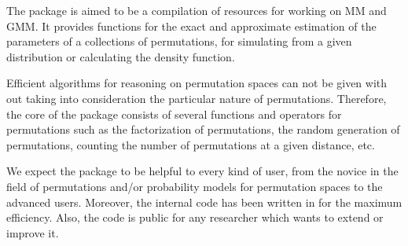 \documentclass[article,nojss]{jss}
\begin{document}
The  package is aimed to be a compilation of resources for working on MM and GMM. It provides functions for the exact and approximate estimation of the parameters of a collections of permutations, for simulating from a given distribution or calculating the density function.

Efficient algorithms for reasoning on permutation spaces can not be given with out taking into consideration the particular nature of permutations. Therefore, the core of the  package consists of several functions and operators for permutations such as the factorization of permutations, the random generation of permutations, counting the number of permutations at a given distance, etc.

We expect the  package to be helpful to every kind of user, from the novice in the field of permutations and/or probability models for permutation spaces to the advanced users. Moreover, the internal code has been written in  for the maximum efficiency. Also, the code is public for any researcher which wants to extend or improve it. 
\end{document}

